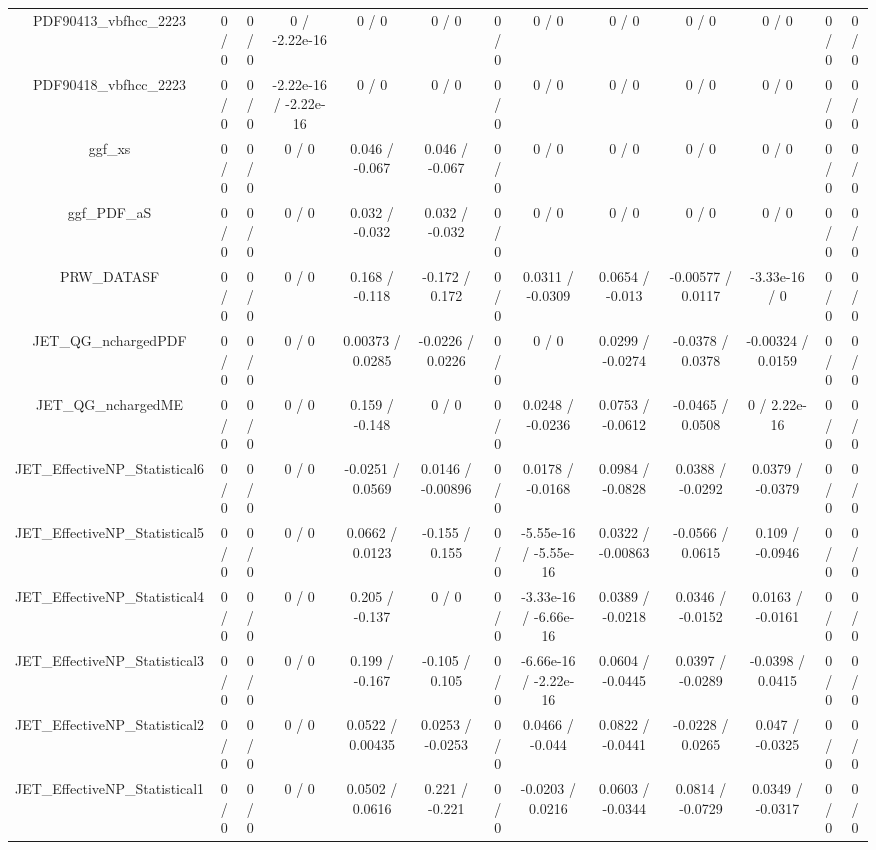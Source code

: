 \documentclass[10pt]{article}
\begin{document}
\begin{table}[htbp]
\begin{center}
\begin{tabular}{|c|c|c|c|c|c|c|c|c|c|c|c|c|}
  PDF90413_vbfhcc_2223 & 0 / 0 & 0 / 0 & 0 / -2.22e-16 & 0 / 0 & 0 / 0 & 0 / 0 & 0 / 0 & 0 / 0 & 0 / 0 & 0 / 0 & 0 / 0 & 0 / 0 \\ 
  PDF90418_vbfhcc_2223 & 0 / 0 & 0 / 0 & -2.22e-16 / -2.22e-16 & 0 / 0 & 0 / 0 & 0 / 0 & 0 / 0 & 0 / 0 & 0 / 0 & 0 / 0 & 0 / 0 & 0 / 0 \\ 
  ggf_xs & 0 / 0 & 0 / 0 & 0 / 0 & 0.046 / -0.067 & 0.046 / -0.067 & 0 / 0 & 0 / 0 & 0 / 0 & 0 / 0 & 0 / 0 & 0 / 0 & 0 / 0 \\ 
  ggf_PDF_aS & 0 / 0 & 0 / 0 & 0 / 0 & 0.032 / -0.032 & 0.032 / -0.032 & 0 / 0 & 0 / 0 & 0 / 0 & 0 / 0 & 0 / 0 & 0 / 0 & 0 / 0 \\ 
  PRW_DATASF & 0 / 0 & 0 / 0 & 0 / 0 & 0.168 / -0.118 & -0.172 / 0.172 & 0 / 0 & 0.0311 / -0.0309 & 0.0654 / -0.013 & -0.00577 / 0.0117 & -3.33e-16 / 0 & 0 / 0 & 0 / 0 \\ 
  JET_QG_nchargedPDF & 0 / 0 & 0 / 0 & 0 / 0 & 0.00373 / 0.0285 & -0.0226 / 0.0226 & 0 / 0 & 0 / 0 & 0.0299 / -0.0274 & -0.0378 / 0.0378 & -0.00324 / 0.0159 & 0 / 0 & 0 / 0 \\ 
  JET_QG_nchargedME & 0 / 0 & 0 / 0 & 0 / 0 & 0.159 / -0.148 & 0 / 0 & 0 / 0 & 0.0248 / -0.0236 & 0.0753 / -0.0612 & -0.0465 / 0.0508 & 0 / 2.22e-16 & 0 / 0 & 0 / 0 \\ 
  JET_EffectiveNP_Statistical6 & 0 / 0 & 0 / 0 & 0 / 0 & -0.0251 / 0.0569 & 0.0146 / -0.00896 & 0 / 0 & 0.0178 / -0.0168 & 0.0984 / -0.0828 & 0.0388 / -0.0292 & 0.0379 / -0.0379 & 0 / 0 & 0 / 0 \\ 
  JET_EffectiveNP_Statistical5 & 0 / 0 & 0 / 0 & 0 / 0 & 0.0662 / 0.0123 & -0.155 / 0.155 & 0 / 0 & -5.55e-16 / -5.55e-16 & 0.0322 / -0.00863 & -0.0566 / 0.0615 & 0.109 / -0.0946 & 0 / 0 & 0 / 0 \\ 
  JET_EffectiveNP_Statistical4 & 0 / 0 & 0 / 0 & 0 / 0 & 0.205 / -0.137 & 0 / 0 & 0 / 0 & -3.33e-16 / -6.66e-16 & 0.0389 / -0.0218 & 0.0346 / -0.0152 & 0.0163 / -0.0161 & 0 / 0 & 0 / 0 \\ 
  JET_EffectiveNP_Statistical3 & 0 / 0 & 0 / 0 & 0 / 0 & 0.199 / -0.167 & -0.105 / 0.105 & 0 / 0 & -6.66e-16 / -2.22e-16 & 0.0604 / -0.0445 & 0.0397 / -0.0289 & -0.0398 / 0.0415 & 0 / 0 & 0 / 0 \\ 
  JET_EffectiveNP_Statistical2 & 0 / 0 & 0 / 0 & 0 / 0 & 0.0522 / 0.00435 & 0.0253 / -0.0253 & 0 / 0 & 0.0466 / -0.044 & 0.0822 / -0.0441 & -0.0228 / 0.0265 & 0.047 / -0.0325 & 0 / 0 & 0 / 0 \\ 
  JET_EffectiveNP_Statistical1 & 0 / 0 & 0 / 0 & 0 / 0 & 0.0502 / 0.0616 & 0.221 / -0.221 & 0 / 0 & -0.0203 / 0.0216 & 0.0603 / -0.0344 & 0.0814 / -0.0729 & 0.0349 / -0.0317 & 0 / 0 & 0 / 0 \\ 

\end{tabular}
\end{center}
\end{table}
\end{document}
